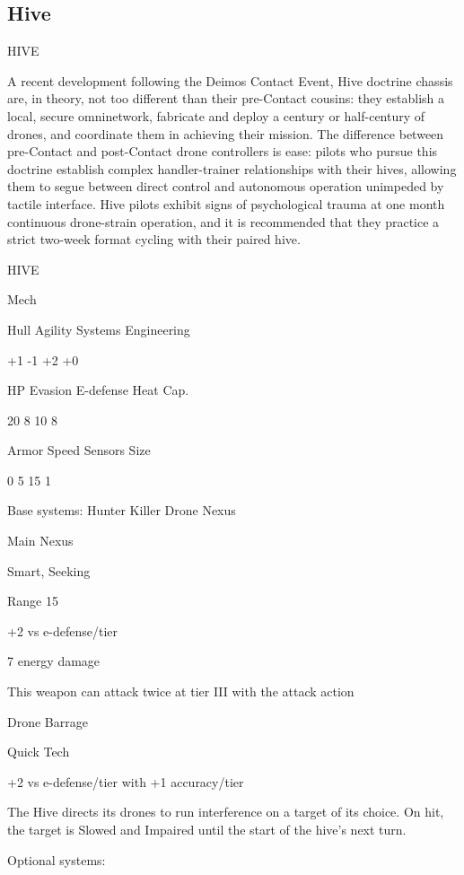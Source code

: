 \subsection{Hive}

                                                   HIVE

A recent development following the Deimos Contact Event, Hive doctrine chassis are, in theory,
not too different than their pre-Contact cousins: they establish a local, secure omninetwork,
fabricate and deploy a century or half-century of drones, and coordinate them in achieving their
mission. The difference between pre-Contact and post-Contact drone controllers is ease: pilots
who pursue this doctrine establish complex handler-trainer relationships with their hives, allowing
them to segue between direct control and autonomous operation unimpeded by tactile interface.
Hive pilots exhibit signs of psychological trauma at one month continuous drone-strain operation,
and it is recommended that they practice a strict two-week format cycling with their paired hive.

 HIVE

 Mech

 Hull       Agility      Systems       Engineering

 +1         -1           +2            +0

 HP         Evasion      E-defense     Heat Cap.

 20         8            10            8

 Armor      Speed        Sensors       Size

 0          5            15            1

Base systems:
Hunter Killer Drone Nexus

Main Nexus

Smart, Seeking

Range 15

+2 vs e-defense/tier

7 energy damage

This weapon can attack twice at tier III with the attack action


Drone Barrage

Quick Tech

+2 vs e-defense/tier with +1 accuracy/tier

The Hive directs its drones to run interference on a target of its choice. On hit, the target is
Slowed and Impaired until the start of the hive's next turn.


Optional systems:

